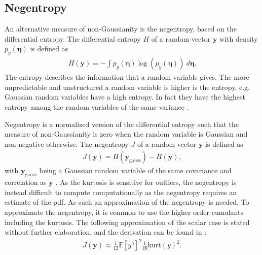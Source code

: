 \subsection{Negentropy}
An alternative measure of non-Gaussianity is the negentropy, based on the differential entropy. The differential entropy $H$ of a random vector $\mathbf{y}$ with density $p_y (\boldsymbol{\eta})$ is defined as
\begin{align*}
H(\mathbf{y}) = - \int p_y (\boldsymbol{\eta}) \log (p_y (\boldsymbol{\eta})) \ d\boldsymbol{\eta}.
\end{align*}
The entropy describes the information that a random variable gives. The more unpredictable and unstructured a random variable is higher is the entropy, e.g. Gaussian random variables have a high entropy. 
In fact they have the highest entropy among the random variables of the same variance \cite[p. 182]{ICA}.

Negentropy is a normalized version of the differential entropy such that the measure of non-Gaussianity is zero when the random variable is Gaussian and non-negative otherwise. The negentropy $J$ of a random vector $\mathbf{y}$ is defined as 
\begin{align*}
J(\mathbf{y}) = H(\mathbf{y}_{\text{gauss}}) - H(\mathbf{y}),
\end{align*}
with $\mathbf{y}_{\text{gauss}}$ being a Gaussian random variable of the same covariance and correlation as $\mathbf{y}$ \cite[p. 182]{ICA}.
As the kurtosis is sensitive for outliers, the negentropy is instead difficult to compute computationally as the negentropy requires an estimate of the pdf. As such an approximation of the negentropy is needed.
To approximate the negentropy, it is common to use the higher order cumulants including the kurtosis. The following approximation of the scalar case is stated without further elaboration, and the derivation can be found in \cite[p. 183]{ICA}: 
\begin{align*}
J(\mathbf{y}) \approx \frac{1}{12} \mathbb{E}[y^{3}]^2 \frac{1}{48}\text{kurt}(y)^2.
\end{align*}

